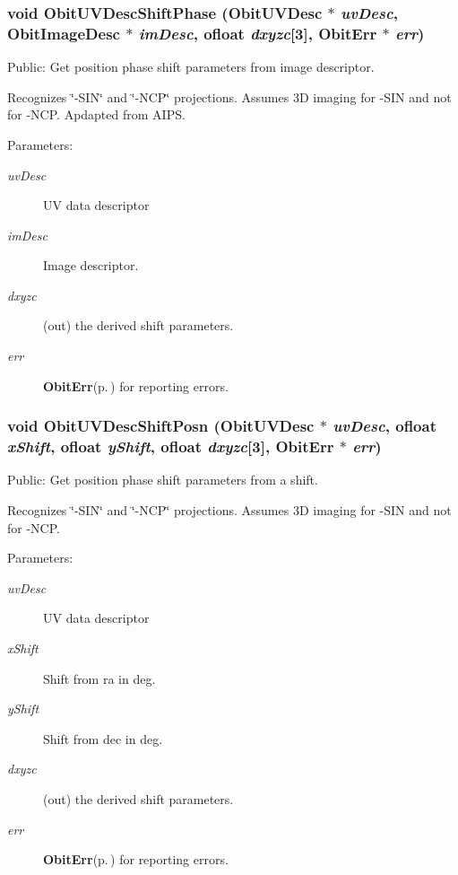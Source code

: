 \subsubsection{\setlength{\rightskip}{0pt plus 5cm}void Obit\-UVDesc\-Shift\-Phase ({\bf Obit\-UVDesc} $\ast$ {\em uv\-Desc}, {\bf Obit\-Image\-Desc} $\ast$ {\em im\-Desc}, {\bf ofloat} {\em dxyzc}[3], {\bf Obit\-Err} $\ast$ {\em err})}\label{ObitUVDesc_8c_a19}


Public: Get position phase shift parameters from image descriptor. 

Recognizes \char`\"{}-SIN\char`\"{} and \char`\"{}-NCP\char`\"{} projections. Assumes 3D imaging for -SIN and not for -NCP. Apdapted from AIPS. \begin{Desc}
\item[Parameters:]
\begin{description}
\item[{\em uv\-Desc}]UV data descriptor \item[{\em im\-Desc}]Image descriptor. \item[{\em dxyzc}](out) the derived shift parameters. \item[{\em err}]{\bf Obit\-Err}{\rm (p.\,\pageref{structObitErr})} for reporting errors. \end{description}
\end{Desc}
\subsubsection{\setlength{\rightskip}{0pt plus 5cm}void Obit\-UVDesc\-Shift\-Posn ({\bf Obit\-UVDesc} $\ast$ {\em uv\-Desc}, {\bf ofloat} {\em x\-Shift}, {\bf ofloat} {\em y\-Shift}, {\bf ofloat} {\em dxyzc}[3], {\bf Obit\-Err} $\ast$ {\em err})}\label{ObitUVDesc_8c_a20}


Public: Get position phase shift parameters from a shift. 

Recognizes \char`\"{}-SIN\char`\"{} and \char`\"{}-NCP\char`\"{} projections. Assumes 3D imaging for -SIN and not for -NCP. \begin{Desc}
\item[Parameters:]
\begin{description}
\item[{\em uv\-Desc}]UV data descriptor \item[{\em x\-Shift}]Shift from ra in deg. \item[{\em y\-Shift}]Shift from dec in deg. \item[{\em dxyzc}](out) the derived shift parameters. \item[{\em err}]{\bf Obit\-Err}{\rm (p.\,\pageref{structObitErr})} for reporting errors. \end{description}
\end{Desc}
